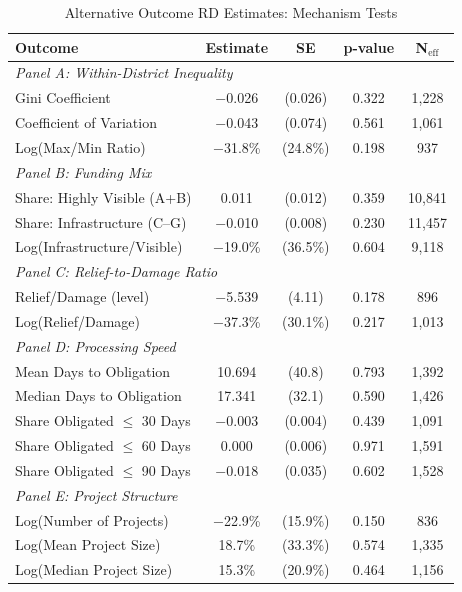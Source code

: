 \documentclass[12pt,letterpaper,oneside]{book}
\begin{document}
\begin{table}[H]
\centering
\caption{Alternative Outcome RD Estimates: Mechanism Tests}
\label{tab:additional_outcomes}
\small
\begin{tabular}{lcccc}
\toprule
Outcome & Estimate & SE & p-value & N$_{\text{eff}}$ \\
\midrule
\multicolumn{5}{l}{\textit{Panel A: Within-District Inequality}} \\
\quad Gini Coefficient & $-$0.026 & (0.026) & 0.322 & 1,228 \\
\quad Coefficient of Variation & $-$0.043 & (0.074) & 0.561 & 1,061 \\
\quad Log(Max/Min Ratio) & $-$31.8\% & (24.8\%) & 0.198 & 937 \\[0.5ex]
\multicolumn{5}{l}{\textit{Panel B: Funding Mix}} \\
\quad Share: Highly Visible (A+B) & 0.011 & (0.012) & 0.359 & 10,841 \\
\quad Share: Infrastructure (C--G) & $-$0.010 & (0.008) & 0.230 & 11,457 \\
\quad Log(Infrastructure/Visible) & $-$19.0\% & (36.5\%) & 0.604 & 9,118 \\[0.5ex]
\multicolumn{5}{l}{\textit{Panel C: Relief-to-Damage Ratio}} \\
\quad Relief/Damage (level) & $-$5.539 & (4.11) & 0.178 & 896 \\
\quad Log(Relief/Damage) & $-$37.3\% & (30.1\%) & 0.217 & 1,013 \\[0.5ex]
\multicolumn{5}{l}{\textit{Panel D: Processing Speed}} \\
\quad Mean Days to Obligation & 10.694 & (40.8) & 0.793 & 1,392 \\
\quad Median Days to Obligation & 17.341 & (32.1) & 0.590 & 1,426 \\
\quad Share Obligated $\leq$ 30 Days & $-$0.003 & (0.004) & 0.439 & 1,091 \\
\quad Share Obligated $\leq$ 60 Days & 0.000 & (0.006) & 0.971 & 1,591 \\
\quad Share Obligated $\leq$ 90 Days & $-$0.018 & (0.035) & 0.602 & 1,528 \\[0.5ex]
\multicolumn{5}{l}{\textit{Panel E: Project Structure}} \\
\quad Log(Number of Projects) & $-$22.9\% & (15.9\%) & 0.150 & 836 \\
\quad Log(Mean Project Size) & 18.7\% & (33.3\%) & 0.574 & 1,335 \\
\quad Log(Median Project Size) & 15.3\% & (20.9\%) & 0.464 & 1,156 \\

\end{tabular}
\end{table}
\end{document}
